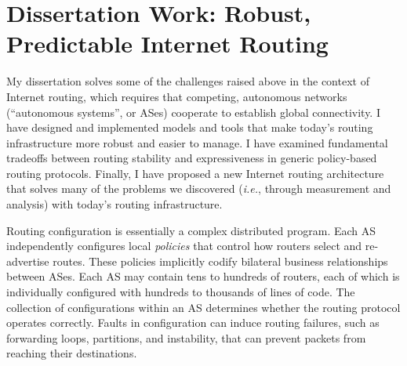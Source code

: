 \documentclass[11pt]{article}
\newcommand{\ie}{{\em i.e.}}
\begin{document}

\section*{Dissertation Work: Robust, Predictable Internet Routing}

My dissertation solves some of the challenges raised above in the
context of Internet routing, which requires that competing, autonomous
networks (``autonomous systems'', or ASes) cooperate to establish global
connectivity.  I have designed and implemented models and tools that
make today's routing infrastructure more robust and easier 
to manage.  I have examined fundamental tradeoffs between
routing stability and expressiveness in generic policy-based routing
protocols.  Finally, I have proposed a new Internet routing architecture
that solves many of the problems we discovered (\ie, through measurement
and analysis) with today's routing infrastructure.

Routing configuration is essentially a complex distributed program.
Each AS independently configures local {\em policies} that control how
routers select and re-advertise routes. These policies implicitly codify
bilateral business relationships between ASes.  Each AS may contain tens
to hundreds of routers, each of which is individually configured with
hundreds to thousands of lines of code. The collection of configurations
within an AS determines whether the routing protocol operates correctly.
Faults in configuration can induce routing failures, such as forwarding
loops, partitions, and instability, that can prevent packets from
reaching their destinations.
\end{document}
